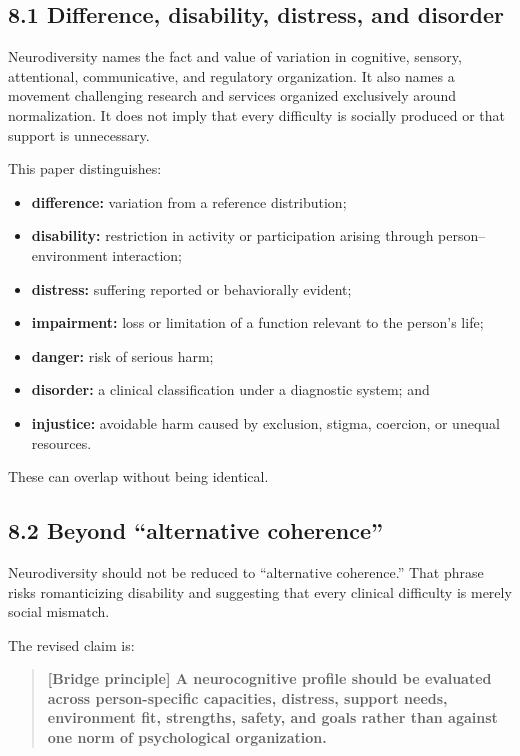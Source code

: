 \documentclass[
  11pt,
]{article}
\providecommand{\tightlist}{%
  \setlength{\itemsep}{0pt}\setlength{\parskip}{0pt}}
\begin{document}
\subsection{8.1 Difference, disability, distress, and
disorder}\label{difference-disability-distress-and-disorder}

Neurodiversity names the fact and value of variation in cognitive,
sensory, attentional, communicative, and regulatory organization. It
also names a movement challenging research and services organized
exclusively around normalization. It does not imply that every
difficulty is socially produced or that support is unnecessary.

This paper distinguishes:

\begin{itemize}
\tightlist
\item
  \textbf{difference:} variation from a reference distribution;
\item
  \textbf{disability:} restriction in activity or participation arising
  through person--environment interaction;
\item
  \textbf{distress:} suffering reported or behaviorally evident;
\item
  \textbf{impairment:} loss or limitation of a function relevant to the
  person's life;
\item
  \textbf{danger:} risk of serious harm;
\item
  \textbf{disorder:} a clinical classification under a diagnostic
  system; and
\item
  \textbf{injustice:} avoidable harm caused by exclusion, stigma,
  coercion, or unequal resources.
\end{itemize}

These can overlap without being identical.

\subsection{8.2 Beyond ``alternative
coherence''}\label{beyond-alternative-coherence}

Neurodiversity should not be reduced to ``alternative coherence.'' That
phrase risks romanticizing disability and suggesting that every clinical
difficulty is merely social mismatch.

The revised claim is:

\begin{quote}
\textbf{{[}Bridge principle{]} A neurocognitive profile should be
evaluated across person-specific capacities, distress, support needs,
environment fit, strengths, safety, and goals rather than against one
norm of psychological organization.}
\end{quote}
\end{document}
